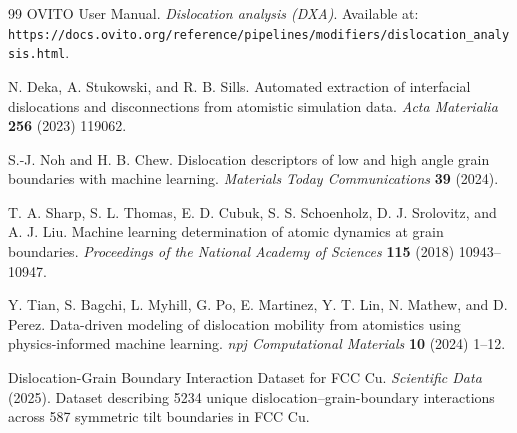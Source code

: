 \begin{thebibliography}{99}
OVITO User Manual.
\newblock \emph{Dislocation analysis (DXA)}.
\newblock Available at: \texttt{https://docs.ovito.org/reference/pipelines/modifiers/dislocation\_analysis.html}.

N. Deka, A. Stukowski, and R. B. Sills.
\newblock Automated extraction of interfacial dislocations and disconnections from atomistic simulation data.
\newblock \emph{Acta Materialia} \textbf{256} (2023) 119062.

S.-J. Noh and H. B. Chew.
\newblock Dislocation descriptors of low and high angle grain boundaries with machine learning.
\newblock \emph{Materials Today Communications} \textbf{39} (2024).

T. A. Sharp, S. L. Thomas, E. D. Cubuk, S. S. Schoenholz, D. J. Srolovitz, and A. J. Liu.
\newblock Machine learning determination of atomic dynamics at grain boundaries.
\newblock \emph{Proceedings of the National Academy of Sciences} \textbf{115} (2018) 10943--10947.

Y. Tian, S. Bagchi, L. Myhill, G. Po, E. Martinez, Y. T. Lin, N. Mathew, and D. Perez.
\newblock Data-driven modeling of dislocation mobility from atomistics using physics-informed machine learning.
\newblock \emph{npj Computational Materials} \textbf{10} (2024) 1--12.

Dislocation-Grain Boundary Interaction Dataset for FCC Cu.
\newblock \emph{Scientific Data} (2025).
\newblock Dataset describing 5234 unique dislocation--grain-boundary interactions across 587 symmetric tilt boundaries in FCC Cu.

\end{thebibliography}
